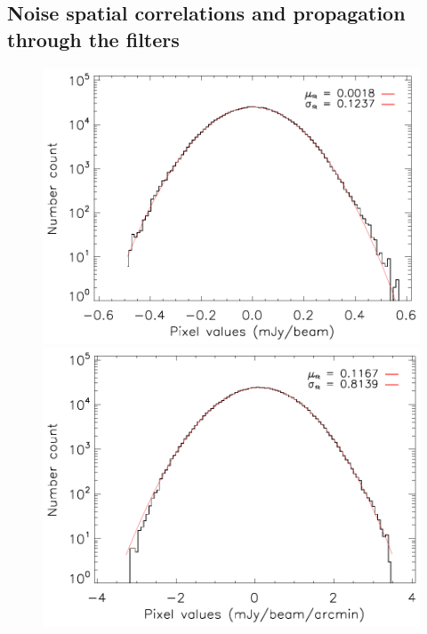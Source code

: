 \documentclass[twocolumn,traditabstract]{aa}
\begin{document}
\subsection{Noise spatial correlations and propagation through the filters}\label{sec:Noise_spatial_correlations_and_propagation_through_the_filters}
\begin{figure}[h]
\centering
\includegraphics[trim=0cm 0cm 0cm 0cm, clip=true, totalheight=4.4cm]{Figure/DoG_noise_stat_CLJ1227.pdf}
\includegraphics[trim=0cm 0cm 0cm 0cm, clip=true, totalheight=4.4cm]{Figure/GGM_noise_stat_CLJ1227.pdf}

\end{figure}
\end{document}
